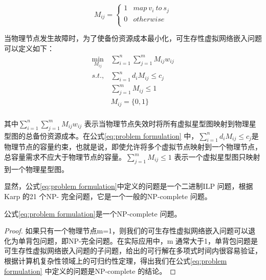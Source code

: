 \begin{equation}
{M_{ij}} = \left\{ {\begin{array}{*{20}{c}}
   1 & {map \ v_i \  to  \ s_j}  \\
   0 & {otherwise}  \\
\end{array}} \right.
\label{eq:indication}
\end{equation}

当物理节点发生故障时，为了使备份资源成本最小化，可生存性虚拟网络嵌入问题可以定义如下：
\begin{equation}
\begin{array}{*{20}{c}}
   {\mathop {\min }\limits_{{M_{ij}}} } & {\sum\limits_{i = 1}^n {\sum\limits_{j = 1}^m {{M_{ij}}{w_{ij}}} } }  \\
   {s.t.,} & {\sum\limits_{i = 1}^n {{d_i}{M_{ij}}}  \le {c_j}}  \\
   {} & {\sum\limits_{j = 1}^m {{M_{ij}}}  \le 1}  \\
   {} & {{M_{ij}} = \{ 0,1\} }  \\
\end{array}
\label{eq:problem formulation}
\end{equation}

其中${\sum\limits_{i = 1}^n {\sum\limits_{j = 1}^m {{M_{ij}}{w_{ij}}} } }$ 表示当物理节点失效时将所有虚拟星型图映射到物理星型图的总备份资源成本。在公式\ref{eq:problem formulation} 中，${\sum\limits_{i = 1}^n {{d_i}{M_{ij}}}  \le {c_j}}$是物理节点的容量约束，也就是说，即使允许将多个虚拟节点映射到一个物理节点，总容量需求不应大于物理节点的容量。${\sum\limits_{j = 1}^m {{M_{ij}}}  \le 1}$ 表示一个虚拟星型图只映射到一个物理星型图。

显然，公式\ref{eq:problem formulation}中定义的问题是一个二进制ILP 问题，根据Karp 的21 个NP- 完全问题\cite{karp1975computational}，它是一个一般的NP-complete 问题。

\begin{theorem}
公式\ref{eq:problem formulation}是一个NP-complete 问题。
\end{theorem}
\begin{proof}
如果只有一个物理节点m=1，则我们的可生存性虚拟网络嵌入问题可以退化为单背包问题，即NP-完全问题。在实际应用中，m 通常大于1，单背包问题是可生存性虚拟网络嵌入问题的子问题，给出的可行解在多项式时间内很容易验证，根据计算机复杂性领域上的可归约性定理\cite{wood1987theory}，得出我们在公式\ref{eq:problem formulation} 中定义的问题是NP-complete 的结论。
\end{proof}

